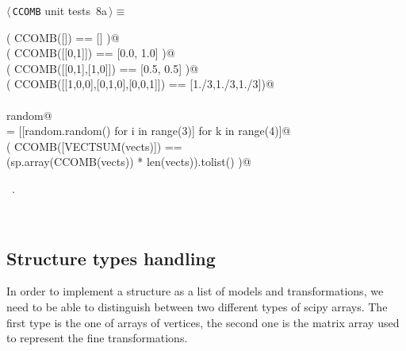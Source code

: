\documentclass[11pt,oneside]{article}	%
\begin{document}
\begin{flushleft} \small
\begin{minipage}{\linewidth} \label{scrap21}
\protect{}$\langle\,$\texttt{CCOMB} unit tests\nobreak\ {\footnotesize 8a}$\,\rangle\equiv$
\vspace{-1ex}
\begin{list}{}{} \item
\mbox{}\verb@assert( CCOMB([]) == [] )@\\
\mbox{}\verb@assert( CCOMB([[0,1]]) == [0.0, 1.0] )@\\
\mbox{}\verb@assert( CCOMB([[0,1],[1,0]]) == [0.5, 0.5] )@\\
\mbox{}\verb@assert( CCOMB([[1,0,0],[0,1,0],[0,0,1]]) == [1./3,1./3,1./3])@\\
\mbox{}\verb@@\\
\mbox{}\verb@import random@\\
\mbox{}\verb@vects = [[random.random() for i in range(3)] for k in range(4)]@\\
\mbox{}\verb@assert( CCOMB([VECTSUM(vects)]) == \@\\
\mbox{}\verb@        (sp.array(CCOMB(vects)) * len(vects)).tolist() )@\\
\mbox{}\verb@@{\NWsep}
\end{list}
\vspace{-1ex}
\footnotesize\addtolength{\baselineskip}{-1ex}
\begin{list}{}{\setlength{\itemsep}{-\parsep}\setlength{\itemindent}{-\leftmargin}}
\item \NWtxtMacroRefIn\ .
\end{list}
\end{minipage}\\[4ex]
\end{flushleft}


\subsection{Structure types handling}

In order to implement a structure as a list of models and transformations, we need to be able to distinguish between two different types of scipy arrays. The first type is the one of arrays of vertices, the second one is the matrix array used to represent the fine transformations.
\end{document}
